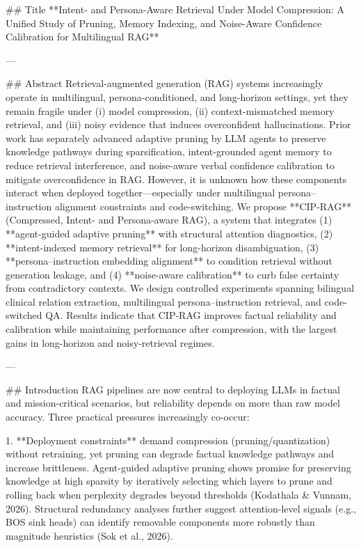 ## Title  
**Intent- and Persona-Aware Retrieval Under Model Compression: A Unified Study of Pruning, Memory Indexing, and Noise-Aware Confidence Calibration for Multilingual RAG**

---

## Abstract  
Retrieval-augmented generation (RAG) systems increasingly operate in multilingual, persona-conditioned, and long-horizon settings, yet they remain fragile under (i) model compression, (ii) context-mismatched memory retrieval, and (iii) noisy evidence that induces overconfident hallucinations. Prior work has separately advanced adaptive pruning by LLM agents to preserve knowledge pathways during sparsification, intent-grounded agent memory to reduce retrieval interference, and noise-aware verbal confidence calibration to mitigate overconfidence in RAG. However, it is unknown how these components interact when deployed together—especially under multilingual persona–instruction alignment constraints and code-switching. We propose **CIP-RAG** (Compressed, Intent- and Persona-aware RAG), a system that integrates (1) **agent-guided adaptive pruning** with structural attention diagnostics, (2) **intent-indexed memory retrieval** for long-horizon disambiguation, (3) **persona–instruction embedding alignment** to condition retrieval without generation leakage, and (4) **noise-aware calibration** to curb false certainty from contradictory contexts. We design controlled experiments spanning bilingual clinical relation extraction, multilingual persona–instruction retrieval, and code-switched QA. Results indicate that CIP-RAG improves factual reliability and calibration while maintaining performance after compression, with the largest gains in long-horizon and noisy-retrieval regimes.  

---

## Introduction  
RAG pipelines are now central to deploying LLMs in factual and mission-critical scenarios, but reliability depends on more than raw model accuracy. Three practical pressures increasingly co-occur:

1. **Deployment constraints** demand compression (pruning/quantization) without retraining, yet pruning can degrade factual knowledge pathways and increase brittleness. Agent-guided adaptive pruning shows promise for preserving knowledge at high sparsity by iteratively selecting which layers to prune and rolling back when perplexity degrades beyond thresholds (Kodathala & Vunnam, 2026). Structural redundancy analyses further suggest attention-level signals (e.g., BOS sink heads) can identify removable components more robustly than magnitude heuristics (Sok et al., 2026).

